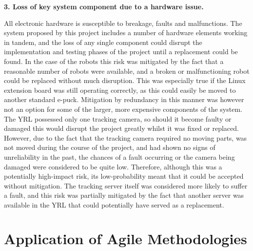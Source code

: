 \textbf{3. Loss of key system component due to a hardware issue.}

All electronic hardware is susceptible to breakage, faults and malfunctions. The system proposed by this project includes a number of hardware elements working in tandem, and the loss of any single component could disrupt the implementation and testing phases of the project until a replacement could be found. In the case of the robots this risk was mitigated by the fact that a reasonable number of robots were available, and a broken or malfunctioning robot could be replaced without much disruption. This was especially true if the Linux extension board was still operating correctly, as this could easily be moved to another standard e-puck. Mitigation by redundancy in this manner was however not an option for some of the larger, more expensive components of the system. The YRL possessed only one tracking camera, so should it become faulty or damaged this would disrupt the project greatly whilst it was fixed or replaced. However, due to the fact that the tracking camera required no moving parts, was not moved during the course of the project, and had shown no signs of unreliability in the past, the chances of a fault occurring or the camera being damaged were considered to be quite low. Therefore, although this was a potentially high-impact risk, its low-probability meant that it could be accepted without mitigation. The tracking server itself was considered more likely to suffer a fault, and this risk was partially mitigated by the fact that another server was available in the YRL that could potentially have served as a replacement.


\section{Application of Agile Methodologies} \label{Agile}



